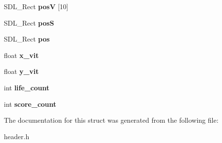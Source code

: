 \begin{DoxyCompactItemize}
S\+D\+L\+\_\+\+Rect {\bfseries posV} \mbox{[}10\mbox{]}
\item 
\mbox{\label{structjoueur_a54599e8b1af93435eadff40780751a53}} 
S\+D\+L\+\_\+\+Rect {\bfseries posS}
\item 
\mbox{\label{structjoueur_a9390dbbfe56dcfed1303ebb3a8eb4464}} 
S\+D\+L\+\_\+\+Rect {\bfseries pos}
\item 
\mbox{\label{structjoueur_ad33e581f9d930071a4d8255026e19730}} 
float {\bfseries x\+\_\+vit}
\item 
\mbox{\label{structjoueur_af1e2def44f8968de5acec0eb534f1aaa}} 
float {\bfseries y\+\_\+vit}
\item 
\mbox{\label{structjoueur_aa81fe7a9557e034692a9acd17bcb3c66}} 
int {\bfseries life\+\_\+count}
\item 
\mbox{\label{structjoueur_ae429ab2b1383c4d404f2912ba14a653a}} 
int {\bfseries score\+\_\+count}
\end{DoxyCompactItemize}


The documentation for this struct was generated from the following file\+:\begin{DoxyCompactItemize}
\item 
header.\+h\end{DoxyCompactItemize}
